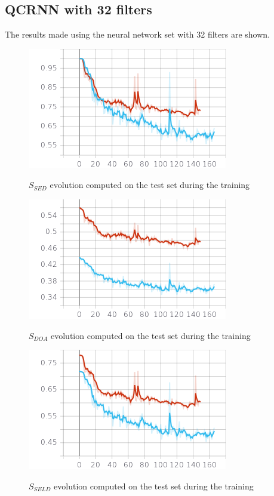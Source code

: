 \documentclass{article}
\begin{document}
	\subsection*{QCRNN with 32 filters}
	The results made using the neural network set with 32 filters are shown.
	\begin{figure}[hbt!]
		\centering
		\includegraphics[height=0.34\textwidth]{images/sed_score.png} \\
		\caption{$S_{SED}$ evolution computed on the test set during the training}
	\end{figure}
	\begin{figure}[hbt!]
		\centering
		\includegraphics[height=0.34\textwidth]{images/doa_score.png} \\
		\caption{$S_{DOA}$ evolution computed on the test set during the training}
	\end{figure}
	\begin{figure}[hbt!]
		\centering
		\includegraphics[height=0.34\textwidth]{images/seld_score.png}\\
		\caption{$S_{SELD}$ evolution computed on the test set during the training}
	\end{figure}
\end{document}
